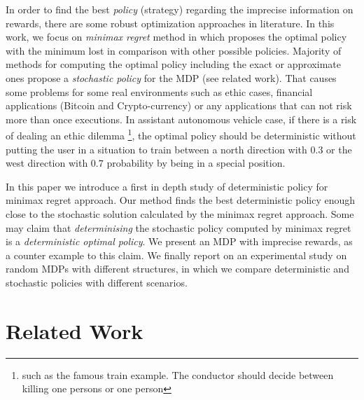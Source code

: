 \documentclass[runningheads,a4paper]{llncs}
\begin{document}
In order to find the best \textit{policy} (strategy) regarding the imprecise information on rewards, there are some robust optimization approaches in literature\cite{Ahmed2017,Iyengar2005,Nilim2003,Xu2009}. In this work, we focus on \textit{minimax regret} method \cite{Regan2009} in which proposes the optimal policy with the minimum lost in comparison with other possible policies. Majority of methods for computing the optimal policy including the exact or approximate ones propose a \textit{stochastic policy} for the MDP (see related work). That causes some problems for some real environments such as ethic cases, financial applications (Bitcoin and Crypto-currency) or any applications that can not risk more than once executions. In assistant autonomous vehicle case, if there is a risk of dealing an ethic dilemma \footnote{such as the famous train example. The conductor should decide between killing one persons or one person}, the optimal policy should be deterministic without putting the user in a situation to train between a north direction with $0.3$ or the west direction with $0.7$ probability by being in a special position.


In this paper we introduce a first in depth study of deterministic policy for minimax regret approach. Our method finds the best deterministic policy enough close to the stochastic solution calculated by the minimax regret approach. Some may claim that \textit{determinising} the stochastic policy computed by minimax regret is a \textit{deterministic optimal policy}. We present an MDP with imprecise rewards, as a counter example to this claim. We finally report on an experimental study on random MDPs with different structures, in which we compare deterministic and stochastic policies with different scenarios. 


\section{Related Work}


\end{document}
